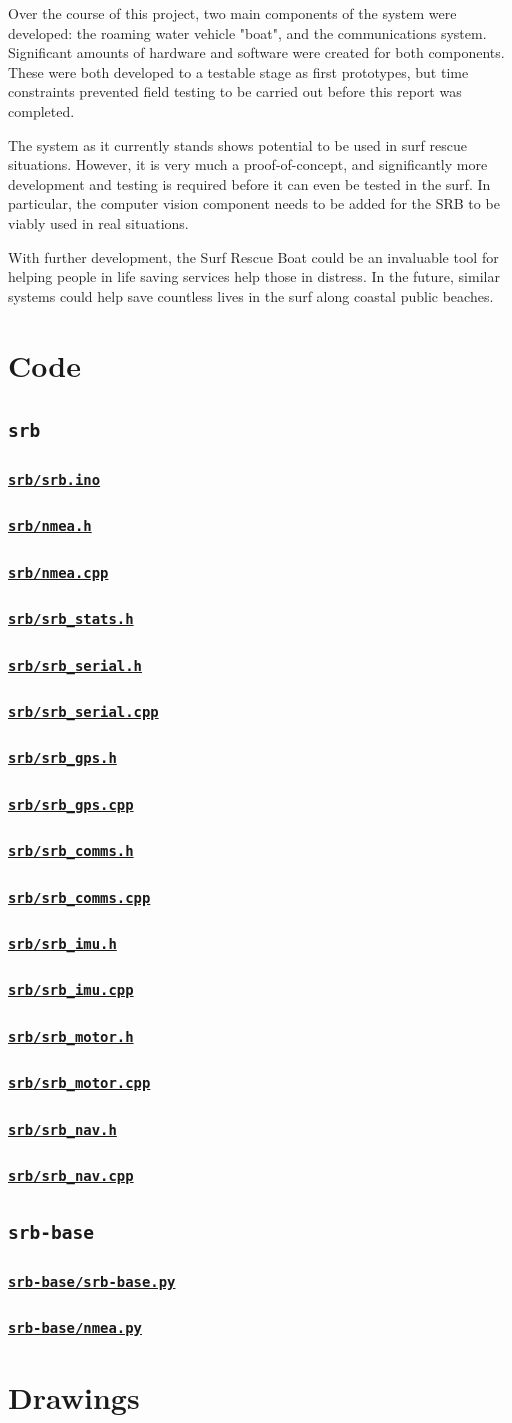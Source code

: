 \documentclass[a4paper]{IEEEtran}
\newcommand{\srbsource}[2]{
\subsubsection{\texttt{\protect\url{#1}}} \mbox{}

}
\begin{document}
Over the course of this project, two main components of the system were developed: the roaming water vehicle "boat", and the communications system. Significant amounts of hardware and software were created for both components. These were both developed to a testable stage as first prototypes, but time constraints prevented field testing to be carried out before this report was completed.

The system as it currently stands shows potential to be used in surf rescue situations. However, it is very much a proof-of-concept, and significantly more development and testing is required before it can even be tested in the surf. In particular, the computer vision component needs to be added for the SRB to be viably used in real situations.

With further development, the Surf Rescue Boat could be an invaluable tool for helping people in life saving services help those in distress. In the future, similar systems could help save countless lives in the surf along coastal public beaches.




\clearpage
\appendices

\section{Code}

\subsection{\texttt{srb}}
\srbsource{srb/srb.ino}{C++}
\srbsource{srb/nmea.h}{C++}
\srbsource{srb/nmea.cpp}{C++}
\srbsource{srb/srb_stats.h}{C++}
\srbsource{srb/srb_serial.h}{C++}
\srbsource{srb/srb_serial.cpp}{C++}
\srbsource{srb/srb_gps.h}{C++}
\srbsource{srb/srb_gps.cpp}{C++}
\srbsource{srb/srb_comms.h}{C++}
\srbsource{srb/srb_comms.cpp}{C++}
\srbsource{srb/srb_imu.h}{C++}
\srbsource{srb/srb_imu.cpp}{C++}
\srbsource{srb/srb_motor.h}{C++}
\srbsource{srb/srb_motor.cpp}{C++}
\srbsource{srb/srb_nav.h}{C++}
\srbsource{srb/srb_nav.cpp}{C++}

\subsection{\texttt{srb-base}}
\srbsource{srb-base/srb-base.py}{Python}
\srbsource{srb-base/nmea.py}{Python}

\onecolumn
\section{Drawings}
\end{document}
